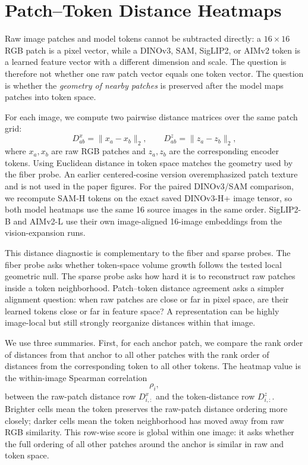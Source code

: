 \documentclass{article}
\begin{document}



\appendix

\section{Patch--Token Distance Heatmaps}
\label{app:patch-token-distance}

Raw image patches and model tokens cannot be subtracted directly: a $16\times16$ RGB patch is a pixel vector, while a DINOv3, SAM, SigLIP2, or AIMv2 token is a learned feature vector with a different dimension and scale. The question is therefore not whether one raw patch vector equals one token vector. The question is whether the \emph{geometry of nearby patches} is preserved after the model maps patches into token space.

For each image, we compute two pairwise distance matrices over the same patch grid:
\[
  D^x_{ab}=\|x_a-x_b\|_2,
  \qquad
  D^z_{ab}=\|z_a-z_b\|_2,
\]
where $x_a,x_b$ are raw RGB patches and $z_a,z_b$ are the corresponding encoder tokens. Using Euclidean distance in token space matches the geometry used by the fiber probe. An earlier centered-cosine version overemphasized patch texture and is not used in the paper figures. For the paired DINOv3/SAM comparison, we recompute SAM-H tokens on the exact saved DINOv3-H+ image tensor, so both model heatmaps use the same 16 source images in the same order. SigLIP2-B and AIMv2-L use their own image-aligned 16-image embeddings from the vision-expansion runs.

This distance diagnostic is complementary to the fiber and sparse probes. The fiber probe asks whether token-space volume growth follows the tested local geometric null. The sparse probe asks how hard it is to reconstruct raw patches inside a token neighborhood. Patch--token distance agreement asks a simpler alignment question: when raw patches are close or far in pixel space, are their learned tokens close or far in feature space? A representation can be highly image-local but still strongly reorganize distances within that image.

We use three summaries. First, for each anchor patch, we compare the rank order of distances from that anchor to all other patches with the rank order of distances from the corresponding token to all other tokens. The heatmap value is the within-image Spearman correlation
\[
  \rho_i,
\]
between the raw-patch distance row $D^x_{i,:}$ and the token-distance row $D^z_{i,:}$. Brighter cells mean the token preserves the raw-patch distance ordering more closely; darker cells mean the token neighborhood has moved away from raw RGB similarity. This row-wise score is global within one image: it asks whether the full ordering of all other patches around the anchor is similar in raw and token space.
\end{document}
